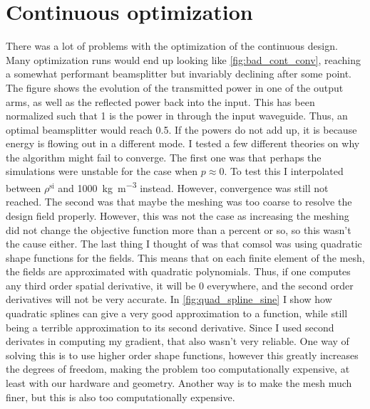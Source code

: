 \section{Continuous optimization}\label{sec:res_cont}

There was a lot of problems with the optimization of the continuous design.
Many optimization runs would end up looking like \cref{fig:bad_cont_conv},
reaching a somewhat performant beamsplitter but invariably declining after some
point.
The figure shows the evolution of the transmitted power in one of the
output arms, as well as the reflected power back into the input.
This has been normalized such that 1 is the power in through the input waveguide.
Thus, an optimal beamsplitter would reach 0.5.
If the powers do not add up, it is because energy is flowing out in a different
mode.
I tested a few different theories on why the algorithm might fail to converge.
The first one was that perhaps the simulations were unstable for the case when
$p\approx 0$. To test this I interpolated between $\rho^\text{si}$ and
\qty{1000}{\kg\per\m^3} instead. However, convergence was still not reached.
The second was that maybe the meshing was too coarse to resolve the design
field properly. However, this was not the case as increasing the meshing did not
change the objective function more than a percent or so, so this wasn't the
cause either.
The last thing I thought of was that comsol was using quadratic shape functions
for the fields. This means that on each finite element of the mesh, the fields
are approximated with quadratic polynomials. Thus, if one computes any third
order spatial derivative, it will be 0 everywhere, and the second order
derivatives will not be very accurate.
In \cref{fig:quad_spline_sine} I show how quadratic splines can give a very good
approximation to a function, while still being a terrible approximation to its
second derivative.
Since I used second derivates in computing my gradient, that also wasn't very
reliable.
One way of solving this is to use higher order shape functions, however this
greatly increases the degrees of freedom, making the problem too computationally
expensive, at least with our hardware and geometry.
Another way is to make the mesh much finer, but this is also too computationally
expensive.
